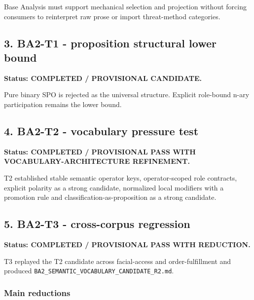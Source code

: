 \documentclass[
  10pt,
  a4paper,
]{article}
\begin{document}
Base Analysis must support mechanical selection and projection without
forcing consumers to reinterpret raw prose or import threat-method
categories.

\subsection{3. BA2-T1 - proposition structural lower
bound}\label{3-ba2-t1---proposition-structural-lower-bound}

\textbf{Status: COMPLETED / PROVISIONAL CANDIDATE.}

Pure binary SPO is rejected as the universal structure. Explicit
role-bound n-ary participation remains the lower bound.

\subsection{4. BA2-T2 - vocabulary pressure
test}\label{4-ba2-t2---vocabulary-pressure-test}

\textbf{Status: COMPLETED / PROVISIONAL PASS WITH
VOCABULARY-ARCHITECTURE REFINEMENT.}

T2 established stable semantic operator keys, operator-scoped role
contracts, explicit polarity as a strong candidate, normalized local
modifiers with a promotion rule and classification-as-proposition as a
strong candidate.

\subsection{5. BA2-T3 - cross-corpus
regression}\label{5-ba2-t3---cross-corpus-regression}

\textbf{Status: COMPLETED / PROVISIONAL PASS WITH REDUCTION.}

T3 replayed the T2 candidate across facial-access and order-fulfillment
and produced \texttt{BA2\_SEMANTIC\_VOCABULARY\_CANDIDATE\_R2.md}.

\subsubsection{Main reductions}\label{main-reductions}
\end{document}
